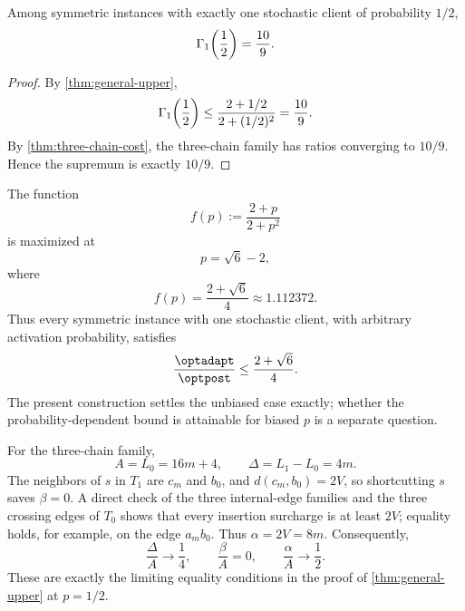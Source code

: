 \begin{theorem}\label{thm:sym-clair}
Among symmetric instances with exactly one stochastic client of probability
$1/2$,
\[
  \Gamma_{1}\!\left(\frac12\right)=\frac{10}{9}.
\]
\end{theorem}

\begin{proof}
By \cref{thm:general-upper},
\[
  \Gamma_{1}\!\left(\frac12\right)
  \le
  \frac{2+1/2}{2+(1/2)^2}
  =\frac{10}{9}.
\]
By \cref{thm:three-chain-cost}, the three-chain family has ratios converging
to $10/9$.  Hence the supremum is exactly $10/9$.
\end{proof}

\begin{remark}
The function
\[
  f(p):=\frac{2+p}{2+p^2}
\]
is maximized at
\[
  p=\sqrt6-2,
\]
where
\[
  f(p)=\frac{2+\sqrt6}{4}\approx1.112372.
\]
Thus every symmetric instance with one stochastic client, with arbitrary
activation probability, satisfies
\[
  \frac{\optadapt}{\optpost}
  \le\frac{2+\sqrt6}{4}.
\]
The present construction settles the unbiased case exactly; whether the
probability-dependent bound is attainable for biased $p$ is a separate
question.
\end{remark}

\begin{remark}
For the three-chain family,
\[
  A=L_0=16m+4,
  \qquad
  \Delta=L_1-L_0=4m.
\]
The neighbors of $s$ in $T_1$ are $c_m$ and $b_0$, and
$d(c_m,b_0)=2V$, so shortcutting $s$ saves $\beta=0$.  A direct check of the
three internal-edge families and the three crossing edges of $T_0$ shows that
every insertion surcharge is at least $2V$; equality holds, for example, on
the edge $a_mb_0$.  Thus $\alpha=2V=8m$.  Consequently,
\[
  \frac{\Delta}{A}\longrightarrow\frac14,
  \qquad
  \frac{\beta}{A}=0,
  \qquad
  \frac{\alpha}{A}\longrightarrow\frac12.
\]
These are exactly the limiting equality conditions in the proof of
\cref{thm:general-upper} at $p=1/2$.
\end{remark}

